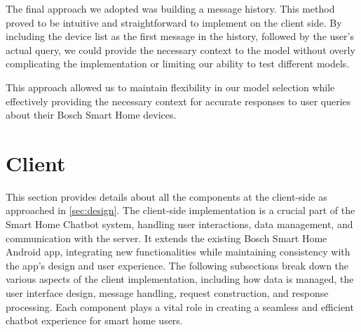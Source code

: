 The final approach we adopted was building a message history. This method proved to be intuitive and straightforward to implement on the client side. By including the device list as the first message in the history, followed by the user's actual query, we could provide the necessary context to the model without overly complicating the implementation or limiting our ability to test different models.

This approach allowed us to maintain flexibility in our model selection while effectively providing the necessary context for accurate responses to user queries about their Bosch Smart Home devices.


\section{Client}
This section provides details about all the components at the client-side as approached in \cref{sec:design}. 
The client-side implementation is a crucial part of the Smart Home Chatbot system, handling user interactions, data management, and communication with the server. It extends the existing Bosch Smart Home Android app, integrating new functionalities while maintaining consistency with the app's design and user experience. 
The following subsections break down the various aspects of the client implementation, including how data is managed, the user interface design, message handling, request construction, and response processing. 
Each component plays a vital role in creating a seamless and efficient chatbot experience for smart home users.


